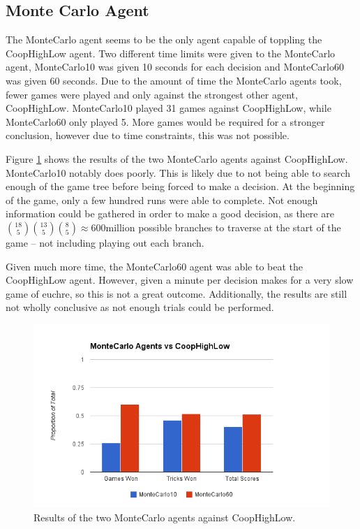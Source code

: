 \subsection{Monte Carlo Agent}

The MonteCarlo agent seems to be the only agent capable of toppling the CoopHighLow agent. Two different time limits were given to the MonteCarlo agent,
MonteCarlo10 was given 10 seconds for each decision and MonteCarlo60 was given 60 seconds. Due to the amount of time the MonteCarlo agents took,
fewer games were played and only against the strongest other agent, CoopHighLow. MonteCarlo10 played 31 games against CoopHighLow, while MonteCarlo60
only played 5. More games would be required for a stronger conclusion, however due to time constraints, this was not possible.

Figure \ref{fig:results_montecarlo} shows the results of the two MonteCarlo agents against CoopHighLow. MonteCarlo10 notably does poorly. This
is likely due to not being able to search enough of the game tree before being forced to make a decision. At the beginning of the game, only
a few hundred runs were able to complete. Not enough information could be gathered in order to make a good decision, as there are
${18 \choose 5}{13 \choose 5}{8 \choose 5} \approx 600 \text{million}$ possible branches to traverse at the start of the game -- not including
playing out each branch.

Given much more time, the MonteCarlo60 agent was able to beat the CoopHighLow agent. However, given a minute per decision makes for a very slow
game of euchre, so this is not a great outcome. Additionally, the results are still not wholly conclusive as not enough trials could be performed. 

\begin{figure}[ht]
    \centering
    \includegraphics[scale=0.5]{data/montecarlo.png}
    \caption{Results of the two MonteCarlo agents against CoopHighLow.}
    \label{fig:results_montecarlo}
\end{figure}

